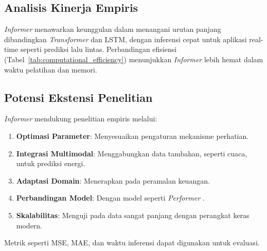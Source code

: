 \subsection{Analisis Kinerja Empiris}
\label{sec:informer_performance}

\textit{Informer} menawarkan keunggulan dalam menangani urutan panjang dibandingkan \textit{Transformer} dan LSTM, dengan inferensi cepat untuk aplikasi real-time seperti prediksi lalu lintas. Perbandingan efisiensi (Tabel~\ref{tab:computational_efficiency}) menunjukkan \textit{Informer} lebih hemat dalam waktu pelatihan dan memori.

\subsection{Potensi Ekstensi Penelitian}
\label{sec:informer_extensions}

\textit{Informer} mendukung penelitian empiris melalui:
\begin{enumerate}
    \item \textbf{Optimasi Parameter}: Menyesuaikan pengaturan mekanisme perhatian.
    \item \textbf{Integrasi Multimodal}: Menggabungkan data tambahan, seperti cuaca, untuk prediksi energi.
    \item \textbf{Adaptasi Domain}: Menerapkan pada peramalan keuangan.
    \item \textbf{Perbandingan Model}: Dengan model seperti \textit{Performer} \citep{Choromanski2021}.
    \item \textbf{Skalabilitas}: Menguji pada data sangat panjang dengan perangkat keras modern.
\end{enumerate}
Metrik seperti MSE, MAE, dan waktu inferensi dapat digunakan untuk evaluasi.